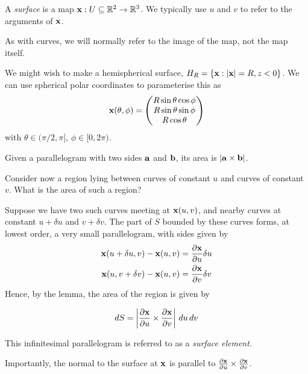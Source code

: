 \documentclass{../template/note}
\begin{document}
    \begin{definition*}
        A \emph{surface} is a map \(\V x: U \subseteq \RR^2 \to \RR^3\). We typically use \(u\) and \(v\) to refer to the arguments of \(\V x\).
    \end{definition*}
    
    As with curves, we will normally refer to the image of the map, not the map itself.
    
    \begin{example*}
        We might wish to make a hemispherical surface, \(H_R = \{\V x: |\V x| = R, z < 0\}\). We can use spherical polar coordinates to parameterise this as
        \begin{align*}
            \V x(\theta, \phi) = \begin{pmatrix}
             R \sin \theta \cos \phi \\
             R \sin \theta \sin \phi \\
             R \cos \theta  \\
            \end{pmatrix}
        \end{align*}
        with \(\theta \in (\pi/2, \pi]\), \(\phi \in [0, 2\pi)\).
    \end{example*}
    
    \begin{lemma*}
        Given a parallelogram with two sides \(\V a\) and \(\V b\), its area is \(|\V a \times \V b|\).
    \end{lemma*}
    
    Consider now a region lying between curves of constant \(u\) and curves of constant \(v\). What is the area of such a region?

    Suppose we have two such curves meeting at \(\V x(u, v)\), and nearby curves at constant \(u + \delta u\) and \(v + \delta v\). The part of \(S\) bounded by these curves forms, at lowest order, a very small parallelogram, with sides given by
    \begin{align*}
        \V x(u + \delta u, v) - \V x(u, v) &= \pd{\V x}{u}\delta u \\
        \V x(u, v + \delta v) - \V x(u, v) &= \pd{\V x}{v}\delta v 
    \end{align*}
    Hence, by the lemma, the area of the region is given by
    \begin{proposition}
        \label{4.4} \[
            dS = \left|\pd{\V x}{u} \times \pd{\V x}{v}\right|\D u \D v
        \]
    \end{proposition}
    This infinitesimal parallelogram is referred to as a \emph{surface element}.
    \begin{remark*}
        Importantly, the normal to the surface at \(\V x\) is parallel to \(\pd{\V x}{u} \times \pd{\V x}{v}\).
    \end{remark*}
    
\end{document}
